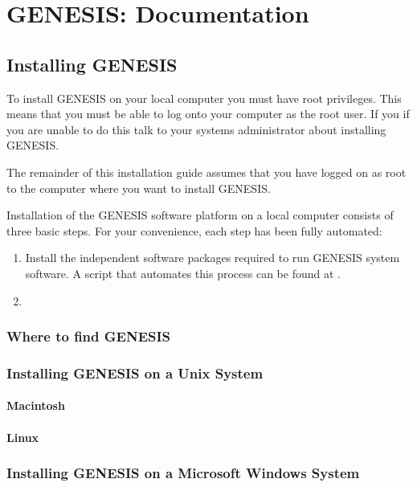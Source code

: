 \documentclass[12pt]{article}
\begin{document}
\section*{GENESIS: Documentation}

\subsection*{Installing GENESIS}
To install GENESIS on your local computer you must have root privileges. This means that you must be able to log onto your computer as the root user. If you if you are unable to do this talk to your systems administrator about installing GENESIS.

The remainder of this installation guide assumes that you have logged on as root to the computer where you want to install GENESIS.

Installation of the GENESIS software platform on a local computer consists of three basic steps. For your convenience, each step has been fully automated:

\begin {enumerate}

\item Install the independent software packages required to run GENESIS system software. A script that automates this process can be found at \href{}{}.

\item 

\end{enumerate}

\subsubsection*{Where to find GENESIS}

\subsubsection*{Installing GENESIS on a Unix System}

\paragraph*{Macintosh}

\paragraph*{Linux}

\subsubsection*{Installing GENESIS on a Microsoft Windows System}
\end{document}
